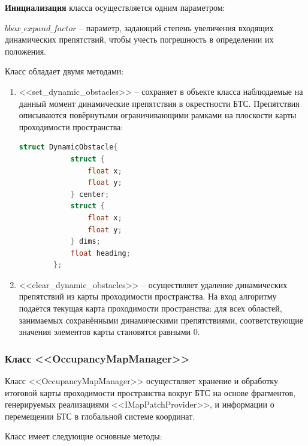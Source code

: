 \textbf{Инициализация} класса осуществляется одним параметром:

 $bbox\_expand\_factor$ -- параметр, задающий степень увеличения входящих динамических препятствий, чтобы учесть погрешность в определении их положения. 

Класс обладает двумя методами:

\begin{enumerate}
	\item <<set\_dynamic\_obstacles>> -- сохраняет в объекте класса наблюдаемые на данный момент динамические препятствия в окрестности БТС. Препятствия описываются повёрнутыми ограничивающими рамками на плоскости карты проходимости пространства:
	\begin{lstlisting}[language=C++,numbers=none]
		struct DynamicObstacle{
			struct {
				float x;
				float y;
			} center;
			struct {
				float x;
				float y;
			} dims;
			float heading;
		};
	\end{lstlisting}
	
	\item <<clear\_dynamic\_obstacles>> -- осуществляет удаление динамических препятствий из карты проходимости пространства. На вход алгоритму подаётся текущая карта проходимости пространства: для всех областей, занимаемых сохранёнными динамическими препятствиями, соответствующие значения элементов карты становятся равными $0$.
\end{enumerate}

\subsubsection{Класс <<OccupancyMapManager>>}

Класс <<OccupancyMapManager>> осуществляет хранение и обработку итоговой карты проходимости пространства вокруг БТС на основе фрагментов, генерируемых реализациями <<IMapPatchProvider>>, и информации о перемещении БТС в глобальной системе координат.

Класс имеет следующие основные методы:

